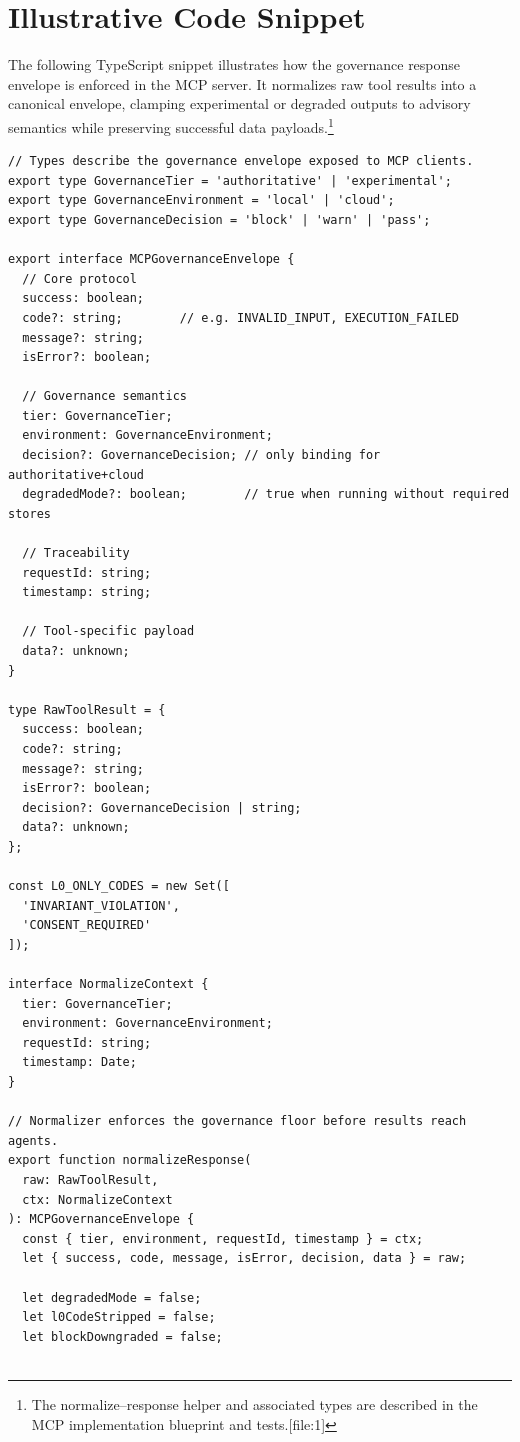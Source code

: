 \documentclass[11pt]{article}
\begin{document}
\section{Illustrative Code Snippet}

The following TypeScript snippet illustrates how the governance response envelope is enforced in the MCP server. It normalizes raw tool results into a canonical envelope, clamping experimental or degraded outputs to advisory semantics while preserving successful data payloads.\footnote{The normalize--response helper and associated types are described in the MCP implementation blueprint and tests.[file:1]}

\begin{lstlisting}
// Types describe the governance envelope exposed to MCP clients.
export type GovernanceTier = 'authoritative' | 'experimental';
export type GovernanceEnvironment = 'local' | 'cloud';
export type GovernanceDecision = 'block' | 'warn' | 'pass';

export interface MCPGovernanceEnvelope {
  // Core protocol
  success: boolean;
  code?: string;        // e.g. INVALID_INPUT, EXECUTION_FAILED
  message?: string;
  isError?: boolean;

  // Governance semantics
  tier: GovernanceTier;
  environment: GovernanceEnvironment;
  decision?: GovernanceDecision; // only binding for authoritative+cloud
  degradedMode?: boolean;        // true when running without required stores

  // Traceability
  requestId: string;
  timestamp: string;

  // Tool-specific payload
  data?: unknown;
}

type RawToolResult = {
  success: boolean;
  code?: string;
  message?: string;
  isError?: boolean;
  decision?: GovernanceDecision | string;
  data?: unknown;
};

const L0_ONLY_CODES = new Set([
  'INVARIANT_VIOLATION',
  'CONSENT_REQUIRED'
]);

interface NormalizeContext {
  tier: GovernanceTier;
  environment: GovernanceEnvironment;
  requestId: string;
  timestamp: Date;
}

// Normalizer enforces the governance floor before results reach agents.
export function normalizeResponse(
  raw: RawToolResult,
  ctx: NormalizeContext
): MCPGovernanceEnvelope {
  const { tier, environment, requestId, timestamp } = ctx;
  let { success, code, message, isError, decision, data } = raw;

  let degradedMode = false;
  let l0CodeStripped = false;
  let blockDowngraded = false;


\end{lstlisting}
\end{document}
